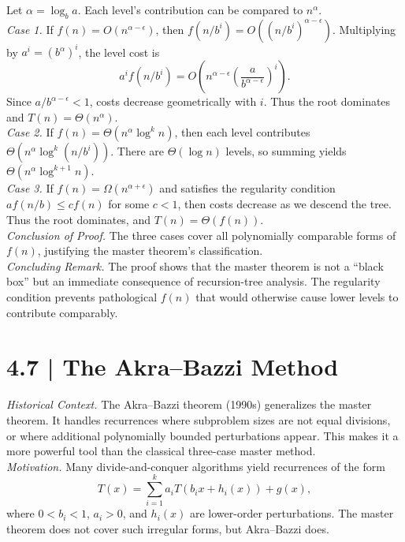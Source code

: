 \documentclass[12pt]{article}
\newcommand{\microhead}[1]{\vspace{0.45em}\noindent\textit{#1}}
\theoremstyle{definition}
\begin{document}
Let $\alpha = \log_b a$. Each level’s contribution can be compared to $n^\alpha$. \\

\microhead{Case 1.} If $f(n) = O(n^{\alpha - \epsilon})$, then $f(n/b^i) = O((n/b^i)^{\alpha - \epsilon})$. Multiplying by $a^i = (b^\alpha)^i$, the level cost is
\[
a^i f(n/b^i) = O\!\left( n^{\alpha - \epsilon} \left(\frac{a}{b^{\alpha - \epsilon}}\right)^i \right).
\]
Since $a/b^{\alpha - \epsilon} < 1$, costs decrease geometrically with $i$. Thus the root dominates and $T(n) = \Theta(n^\alpha)$. \\

\microhead{Case 2.} If $f(n) = \Theta(n^\alpha \log^k n)$, then each level contributes $\Theta(n^\alpha \log^k(n/b^i))$. There are $\Theta(\log n)$ levels, so summing yields $\Theta(n^\alpha \log^{k+1} n)$. \\

\microhead{Case 3.} If $f(n) = \Omega(n^{\alpha + \epsilon})$ and satisfies the regularity condition $af(n/b) \le c f(n)$ for some $c < 1$, then costs decrease as we descend the tree. Thus the root dominates, and $T(n) = \Theta(f(n))$. \\

\microhead{Conclusion of Proof.} The three cases cover all polynomially comparable forms of $f(n)$, justifying the master theorem’s classification. \\

\microhead{Concluding Remark.} The proof shows that the master theorem is not a “black box” but an immediate consequence of recursion-tree analysis. The regularity condition prevents pathological $f(n)$ that would otherwise cause lower levels to contribute comparably. \\

\newpage

\dotfill
\section*{4.7 | The Akra--Bazzi Method}
\dotfill

\microhead{Historical Context.} The Akra--Bazzi theorem (1990s) generalizes the master theorem. It handles recurrences where subproblem sizes are not equal divisions, or where additional polynomially bounded perturbations appear. This makes it a more powerful tool than the classical three-case master method. \\

\microhead{Motivation.} Many divide-and-conquer algorithms yield recurrences of the form
\[
T(x) = \sum_{i=1}^k a_i T(b_i x + h_i(x)) + g(x),
\]
where $0 < b_i < 1$, $a_i > 0$, and $h_i(x)$ are lower-order perturbations. The master theorem does not cover such irregular forms, but Akra--Bazzi does. \\
\end{document}
